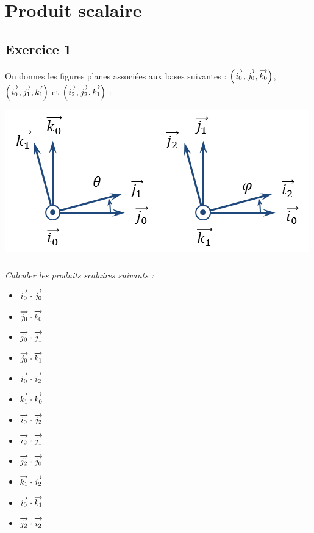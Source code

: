 \documentclass[10pt]{article}
\begin{document}






%
%

\section*{Produit scalaire}

\subsection*{Exercice 1}
On donnes les figures planes associées aux bases suivantes : $\left( \overrightarrow{i_0},\overrightarrow{j_0},\overrightarrow{k_0}\right)$, $\left( \overrightarrow{i_0},\overrightarrow{j_1},\overrightarrow{k_1}\right)$ et $\left( \overrightarrow{i_2},\overrightarrow{j_2},\overrightarrow{k_1}\right)$ :
\begin{center}
\includegraphics[width=.4\textwidth]{images/FiguresPlanes}
\end{center}

\subparagraph{}\textit{Calculer les produits scalaires suivants :}

\begin{multicols}{3}
\begin{itemize}
 \renewcommand{\labelitemi}{\tiny{$\blacksquare$}}
\item $\overrightarrow{i_0} \cdot \overrightarrow{j_0}$
\item $\overrightarrow{j_0} \cdot \overrightarrow{k_0}$
\item $\overrightarrow{j_0} \cdot \overrightarrow{j_1}$
\item $\overrightarrow{j_0} \cdot \overrightarrow{k_1}$
\item $\overrightarrow{i_0} \cdot \overrightarrow{i_2}$
\item $\overrightarrow{k_1} \cdot \overrightarrow{k_0}$
\item $\overrightarrow{i_0} \cdot \overrightarrow{j_2}$
\item $\overrightarrow{i_2} \cdot \overrightarrow{j_1}$
\item $\overrightarrow{j_2} \cdot \overrightarrow{j_0}$
\item $\overrightarrow{k_1} \cdot \overrightarrow{i_2}$
\item $\overrightarrow{i_0} \cdot \overrightarrow{k_1}$
\item $\overrightarrow{j_2} \cdot \overrightarrow{i_2}$
\end{itemize}
\end{multicols}
\end{document}
